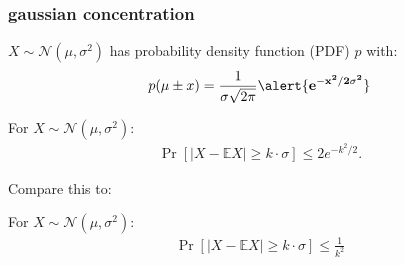 \documentclass[compress]{beamer}
\newcommand{\E}{\mathbb{E}}
\begin{document}
\begin{frame}
	\frametitle{gaussian concentration}
	\small
	$X \sim \mathcal{N}(\mu,\sigma^2)$ has probability density function (PDF) $p$ with:
	\begin{align*}
		p(\mu \pm x) = \frac{1}{\sigma\sqrt{2\pi}} \alert{\mathbf{e^{-x^2/2\sigma^2}}}
	\end{align*}
	\vspace{-1em}
	\begin{lemma}
		For $X \sim \mathcal{N}(\mu,\sigma^2)$:\vspace{-.5em}
		\begin{align*}
			\Pr[|X - \E X| \geq k\cdot\sigma] \leq 2e^{-k^2/2}.
		\end{align*}
	\end{lemma}
Compare this to: 
	\begin{lemma}
	For $X \sim \mathcal{N}(\mu,\sigma^2)$:\vspace{-.5em}
	\begin{align*}
		\Pr[|X - \E X| \geq k\cdot\sigma] \leq \frac{1}{k^2}
	\end{align*}
\end{lemma}
\end{frame}
\end{document}
